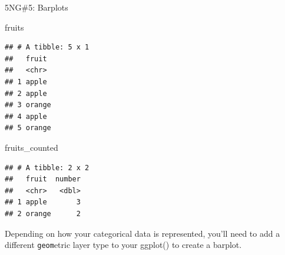 \documentclass[
  ignorenonframetext,
]{beamer}
\newenvironment{Shaded}{\begin{snugshade}}{\end{snugshade}}
\newcommand{\NormalTok}[1]{#1}
\begin{document}
\begin{frame}[fragile]{5NG\#5: Barplots}
\protect\hypertarget{ng5-barplots-2}{}
\tiny

\begin{Shaded}
\begin{Highlighting}[]
\NormalTok{fruits }
\end{Highlighting}
\end{Shaded}

\begin{verbatim}
## # A tibble: 5 x 1
##   fruit 
##   <chr> 
## 1 apple 
## 2 apple 
## 3 orange
## 4 apple 
## 5 orange
\end{verbatim}

\begin{Shaded}
\begin{Highlighting}[]
\NormalTok{fruits\_counted }
\end{Highlighting}
\end{Shaded}

\begin{verbatim}
## # A tibble: 2 x 2
##   fruit  number
##   <chr>   <dbl>
## 1 apple       3
## 2 orange      2
\end{verbatim}

\normalsize

Depending on how your categorical data is represented, you'll need to
add a different \texttt{geom}etric layer type to your ggplot() to create
a barplot.
\end{frame}
\end{document}

